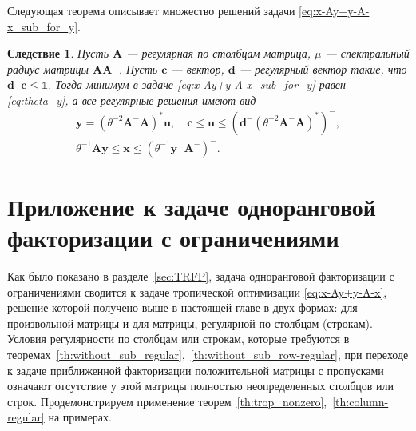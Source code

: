 \documentclass[specialist,
               substylefile = spbu.rtx,
               subf,href,colorlinks=true, 12pt]{disser}
\newtheorem{corollary}{Следствие}
\theoremstyle{definition}
\begin{document}
Следующая теорема описывает множество решений задачи \eqref{eq:x-Ay+y-A-x_sub_for_y}.
\begin{corollary}\label{cor:row-regular_sub_y}
Пусть $\bm{A}$ --- регулярная по столбцам матрица, $\mu$ --- спектральный радиус матрицы $\bm{A}\bm{A}^{-}$. Пусть $\bm{c}$ --- вектор, $\bm{d}$ --- регулярный вектор такие, что $\bm{d}^{-}\bm{c}\leq\mathbb{1}$.
Тогда минимум в задаче \eqref{eq:x-Ay+y-A-x_sub_for_y} равен \eqref{eq:theta_y}, а все регулярные решения имеют вид
\begin{equation*}
\begin{gathered}
\bm{y}
=
(\theta^{-2}\bm{A}^{-}\bm{A})^{\ast}\bm{u},
\quad
\bm{c}\leq\bm{u}\leq(\bm{d}^{-}(\theta^{-2}\bm{A}^{-}\bm{A})^{\ast})^{-},\\
\theta^{-1}\bm{A}\bm{y}
\leq\bm{x}\leq(\theta^{-1}\bm{y}^{-}\bm{A}^{-})^{-}.
\end{gathered}
\end{equation*}
\end{corollary}

\section{Приложение к задаче одноранговой факторизации с ограничениями}\label{chap:AFP}
Как было показано в разделе~\ref{sec:TRFP}, задача одноранговой факторизации с ограничениями сводится к задаче тропической оптимизации \eqref{eq:x-Ay+y-A-x}, решение которой получено выше в настоящей главе в двух формах: для произвольной матрицы и для матрицы, регулярной по столбцам (строкам). Условия регулярности по столбцам или строкам, которые требуются в теоремах~\ref{th:without_sub_regular},~\ref{th:without_sub_row-regular}, при переходе к задаче приближенной факторизации положительной матрицы с пропусками означают отсутствие у этой матрицы полностью неопределенных столбцов или строк. 
Продемонстрируем применение теорем~\ref{th:trop_nonzero},~\ref{th:column-regular} на примерах.  
\end{document}
